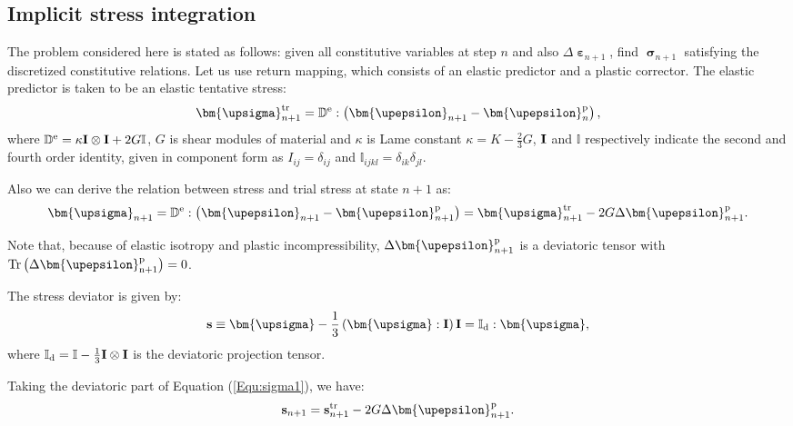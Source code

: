 \subsection{Implicit stress integration}
\noindent
The problem considered here is stated as follows: given all constitutive variables at step $n$ and also $\Delta {{\bm{\upepsilon }}_{n + 1}}$, find $\bm{\upsigma}_{n+1}$  satisfying the discretized constitutive relations. Let us use return mapping, which consists of an elastic predictor and a plastic corrector. The elastic predictor is taken to be an elastic tentative stress:
\begin{equation}
{\bm{\upsigma }}_{n + 1}^{\rm{tr}} = {\mathbb{D}^{\rm{e}}}:\left( {{{\bm{\upepsilon }}_{n + 1}} - {\bm{\upepsilon }}_n^{\rm{p}}} \right),
\end{equation}
where ${\mathbb{D}^{\rm{e}}} = \kappa {\bf{I}} \otimes {\bf{I}} + 2G\mathbb{I}$, $G$ is shear modules of material and $\kappa$ is Lame constant $\kappa  = K - \frac{2}{3}G$, ${\bf{I}}$ and $\mathbb{I}$ respectively indicate the second and fourth order identity, given in component form as ${I_{ij}} = {\delta _{ij}}$ and ${\mathbb{I}_{ijkl}} = {\delta _{ik}}{\delta _{jl}}$.

Also we can derive the relation between stress and trial stress at state $n+1$ as:
\begin{equation}
\label{Equ:sigma1}
{{\bm{\upsigma }}_{n + 1}^{} = {\mathbb{D}^{\rm{e}}}:\left( {{\bm{\upepsilon }}_{n + 1}^{} - {\bm{\upepsilon }}_{n + 1}^{\rm{p}}} \right)} = {\bm{\upsigma }}_{n + 1}^{\rm{tr}} - 2G\Delta {\bm{\upepsilon }}_{n + 1}^{\rm{p}}.
\end{equation}

Note that, because of elastic isotropy and plastic incompressibility, $\Delta {\bm{\upepsilon }}_{n + 1}^{\rm{p}}$ is a deviatoric tensor with $\rm{Tr}\left( {\Delta {\bm{\upepsilon }}_{n + 1}^{\rm{p}}} \right)=0$.

The stress deviator is given by:
\begin{equation}
{\bf{s}} \equiv {\bm{\upsigma }} - \frac{1}{3}\left( {{\bm{\upsigma }}:{\bf{I}}} \right){\bf{I}} = {\mathbb{I}_{\rm{d}}}:{\bm{\upsigma }},
\end{equation}
where ${\mathbb{I}_{\rm{d}}} = \mathbb{I} - \frac{1}{3}{\bf{I}} \otimes {\bf{I}}$ is the deviatoric projection tensor.

Taking the deviatoric part of Equation (\ref{Equ:sigma1}), we have:
\begin{equation}
{{\bf{s}}_{n + 1}} = {\bf{s}}_{n + 1}^{\rm{tr}} - 2G\Delta {\bm{\upepsilon }}_{n + 1}^{\rm{p}}.
\end{equation}

